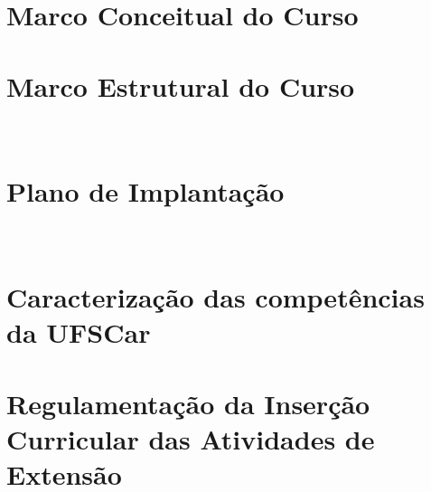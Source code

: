 \documentclass[11pt,a4paper]{report}
\begin{document}
\chapter{Marco Conceitual do Curso}\label{cha:MarcoConceitual}



\chapter{Marco Estrutural do Curso}~\label{cha:MarcoEstrutural}



\chapter{Plano de Implantação}~\label{cha:implantacao}





\clearpage
% 
% 
\printbibliography[heading = bibintoc, title = {Referências Bibliográficas}]



\appendix

\chapter{Caracterização das competências da UFSCar}\label{cha:competencias}



\chapter{Regulamentação da Inserção Curricular das Atividades de Extensão}~\label{cha:extensao}

%
\end{document}
